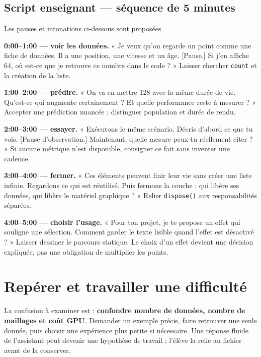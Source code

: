 \documentclass[
  canadien,
  11pt,
  a4paper,
]{report}
\begin{document}
\subsection{Script enseignant --- séquence de 5
minutes}\label{script-enseignant-suxe9quence-de-5-minutes-5}

Les pauses et intonations ci-dessous sont proposées.

\textbf{0:00--1:00 --- voir les données.} « Je veux qu'on regarde un
point comme une fiche de données. Il a une position, une vitesse et un
âge. {[}Pause.{]} Si j'en affiche 64, où est-ce que je retrouve ce
nombre dans le code ? » Laisser chercher \texttt{count} et la création
de la liste.

\textbf{1:00--2:00 --- prédire.} « On va en mettre 128 avec la même
durée de vie. Qu'est-ce qui augmente certainement ? Et quelle
performance reste à mesurer ? » Accepter une prédiction nuancée ;
distinguer population et durée de rendu.

\textbf{2:00--3:00 --- essayer.} « Exécutons le même scénario. Décris
d'abord ce que tu vois. {[}Pause d'observation.{]} Maintenant, quelle
mesure peux-tu réellement citer ? » Si aucune métrique n'est disponible,
consigner ce fait sans inventer une cadence.

\textbf{3:00--4:00 --- fermer.} « Ces éléments peuvent finir leur vie
sans créer une liste infinie. Regardons ce qui est réutilisé. Puis
fermons la couche : qui libère ses données, qui libère le matériel
graphique ? » Relier \texttt{dispose()} aux responsabilités séparées.

\textbf{4:00--5:00 --- choisir l'usage.} « Pour ton projet, je te
propose un effet qui souligne une sélection. Comment garder le texte
lisible quand l'effet est désactivé ? » Laisser dessiner le parcours
statique. Le choix d'un effet devient une décision expliquée, pas une
obligation de multiplier les points.

\section{Repérer et travailler une
difficulté}\label{repuxe9rer-et-travailler-une-difficultuxe9-5}

La confusion à examiner est : \textbf{confondre nombre de données,
nombre de maillages et coût GPU}. Demander un exemple précis, faire
retrouver une seule donnée, puis choisir une expérience plus petite si
nécessaire. Une réponse fluide de l'assistant peut devenir une hypothèse
de travail ; l'élève la relie au fichier avant de la conserver.
\end{document}
